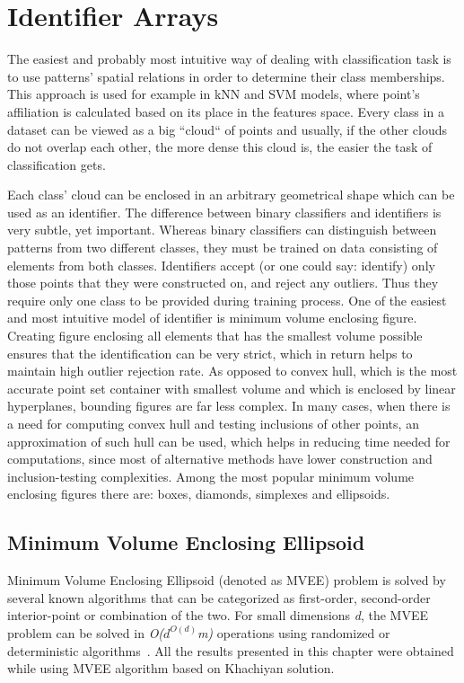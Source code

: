 \chapter{Identifier Arrays}

The easiest and probably most intuitive way of dealing with classification task is to use patterns' spatial relations in order to determine their class memberships. This approach is used for example in kNN and SVM models, where point's affiliation is calculated based on its place in the features space. Every class in a dataset can be viewed as a big ``cloud`` of points and usually, if the other clouds do not overlap each other, the more dense this cloud is, the easier the task of classification gets.

Each class' cloud can be enclosed in an arbitrary geometrical shape which can be used as an identifier. The difference between binary classifiers and identifiers is very subtle, yet important. Whereas binary classifiers can distinguish between patterns from two different classes, they must be trained on data consisting of elements from both classes. Identifiers accept (or one could say: identify) only those points that they were constructed on, and reject any outliers. Thus they require only one class to be provided during training process. One of the easiest and most intuitive model of identifier is minimum volume enclosing figure. Creating figure enclosing all elements that has the smallest volume possible ensures that the identification can be very strict, which in return helps to maintain high outlier rejection rate. As opposed to convex hull, which is the most accurate point set container with smallest volume and which is enclosed by linear hyperplanes, bounding figures are far less complex. In many cases, when there is a need for computing convex hull and testing inclusions of other points, an approximation of such hull can be used, which helps in reducing time needed for computations, since most of alternative methods have lower construction and inclusion-testing complexities. Among the most popular minimum volume enclosing figures there are: boxes, diamonds, simplexes and ellipsoids.

\section{Minimum Volume Enclosing Ellipsoid}

Minimum Volume Enclosing Ellipsoid (denoted as MVEE) problem is solved by several known algorithms that can be categorized as first-order, second-order interior-point or combination of the two. For small dimensions \textit{d}, the MVEE problem can be solved in \textit{O($d^{O(d)}$m)} operations using randomized or deterministic algorithms~\cite{MVEEMichaelTodd2005}. All the results presented in this chapter were obtained while using MVEE algorithm based on Khachiyan solution.

